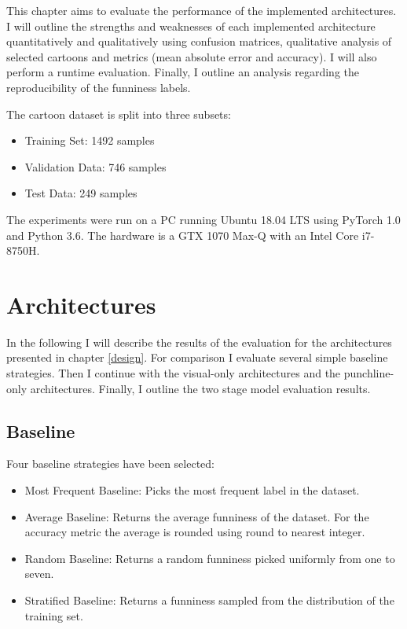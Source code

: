 \documentclass[draft,final,oneside]{vutinfth} %
\begin{document}
This chapter aims to evaluate the performance of the implemented architectures. I will outline the strengths and weaknesses of each implemented architecture quantitatively and qualitatively using confusion matrices, qualitative analysis of selected cartoons and metrics (mean absolute error and accuracy). I will also perform a runtime  evaluation. Finally, I outline an analysis regarding the reproducibility of the funniness labels.

The cartoon dataset is split into three subsets:

\begin{itemize}
\item Training Set: 1492 samples %
\item Validation Data: 746 samples %
\item Test Data: 249 samples %
\end{itemize}

The experiments were run on a PC running Ubuntu 18.04 LTS using PyTorch 1.0 and Python 3.6. The hardware is a GTX 1070 Max-Q with an Intel Core i7-8750H.





\section{Architectures}
In the following I will describe the results of the evaluation for the architectures presented in chapter \ref{design}. For comparison I evaluate several simple baseline strategies. Then I continue with the visual-only architectures and the punchline-only architectures. Finally, I outline the two stage model evaluation results.

\pagebreak
\subsection{Baseline}

Four baseline strategies have been selected: 

\begin{itemize}

\item Most Frequent Baseline: Picks the most frequent label in the dataset.
\item Average Baseline: Returns the average funniness of the dataset. For the accuracy metric the average is rounded using round to nearest integer.
\item Random Baseline: Returns a random funniness picked uniformly from one to seven.
\item Stratified Baseline: Returns a funniness sampled from the distribution of the
training set.

\end{itemize}
\end{document}
